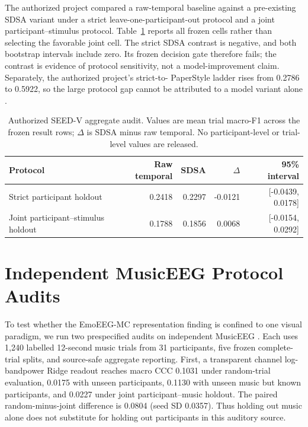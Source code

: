 The authorized project compared a raw-temporal baseline against a pre-existing
SDSA variant under a strict leave-one-participant-out protocol and a joint
participant--stimulus protocol. Table~\ref{tab:seedv-case} reports all frozen
cells rather than selecting the favorable joint cell. The strict SDSA contrast
is negative, and both bootstrap intervals include zero. Its frozen decision
gate therefore fails; the contrast is evidence of protocol sensitivity, not a
model-improvement claim. Separately, the authorized project's strict-to-
PaperStyle ladder rises from 0.2786 to 0.5922, so the large protocol gap cannot
be attributed to a model variant alone \citep{li2019seedv}.

\begin{table}[t]
  \caption{Authorized SEED-V aggregate audit. Values are mean trial macro-F1
  across the frozen result rows; $\Delta$ is SDSA minus raw temporal. No
  participant-level or trial-level values are released.}
  \label{tab:seedv-case}
  \centering
  \small
  \setlength{\tabcolsep}{5pt}
  \begin{tabularx}{\linewidth}{@{}Xrrrr@{}}
    \toprule
    Protocol & Raw temporal & SDSA & $\Delta$ & 95\% interval \\
    \midrule
    Strict participant holdout & 0.2418 & 0.2297 & -0.0121 & [-0.0439, 0.0178] \\
    Joint participant--stimulus holdout & 0.1788 & 0.1856 & 0.0068 & [-0.0154, 0.0292] \\
    \bottomrule
  \end{tabularx}
\end{table}

\section{Independent MusicEEG Protocol Audits}
\label{app:music-labram}

To test whether the EmoEEG-MC representation finding is confined to one visual
paradigm, we run two prespecified audits on independent MusicEEG
\citep{daly2020musiceeg}. Each uses 1,240 labelled 12-second music trials from
31 participants, five frozen complete-trial splits, and source-safe aggregate
reporting. First, a transparent channel log-bandpower Ridge readout reaches
macro CCC 0.1031 under random-trial evaluation, 0.0175 with unseen
participants, 0.1130 with unseen music but known participants, and 0.0227
under joint participant--music holdout. The paired random-minus-joint
difference is 0.0804 (seed SD 0.0357). Thus holding out music alone does not
substitute for holding out participants in this auditory source.

